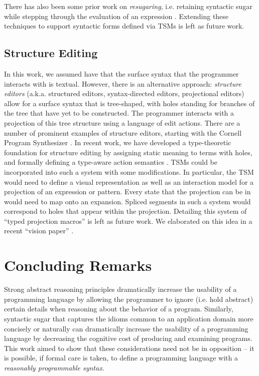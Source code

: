 There has also been some prior work on \emph{resugaring}, i.e. retaining syntactic sugar while stepping through the evaluation of an expression \cite{DBLP:conf/pldi/PombrioK14,DBLP:conf/icfp/PombrioK15}. Extending these techniques to support syntactic forms defined via TSMs is left as future work.

\subsection{Structure Editing}
In this work, we assumed have that the surface syntax that the programmer interacts with is textual. However, there is an alternative approach:  \emph{structure editors} (a.k.a. structured editors, syntax-directed editors, projectional editors)  allow for a surface syntax that is tree-shaped, with holes standing for branches of the tree that have yet to be constructed. The programmer interacts with a projection of this tree structure using a language of edit actions. There are a number of prominent examples of structure editors, starting with the Cornell Program Synthesizer \cite{teitelbaum_cornell_1981}. In recent work, we have developed a type-theoretic foundation for structure editing by assigning static meaning to terms with holes, and formally defining a type-aware action semantics \cite{DBLP:conf/popl/OmarVHAH17}. TSMs could be incorporated into such a system with some modifications. In particular, the TSM would need to define a visual representation as well as an interaction model for a projection of an expression or pattern. Every state that the projection can be in would need to map onto an expansion. Spliced segments in such a system would correspond to holes that appear within the projection. Detailing this system of ``typed projection macros'' is left as future work. We elaborated on this idea in a recent ``vision paper'' \cite{snapl17}.

\section{Concluding Remarks}
Strong abstract reasoning principles dramatically increase the usability of a programming language by allowing the programmer to ignore (i.e. hold abstract) certain details when reasoning about the behavior of a program. Similarly, syntactic sugar that captures the idioms common to an application domain more concisely or naturally can dramatically increase the usability of a programming language by decreasing the cognitive cost of producing and examining programs. This work aimed to show that these considerations need not be in opposition -- it is possible, if formal care is taken, to define a programming language with a \emph{reasonably programmable syntax}. 

